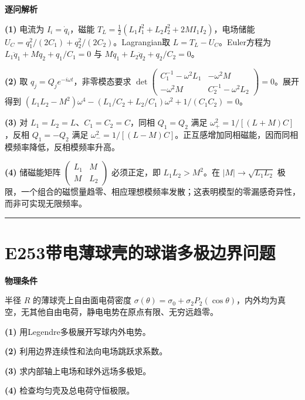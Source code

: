 \documentclass[UTF8,a4paper,11pt,oneside,openany]{ctexbook}
\begin{document}
\par\medskip\noindent\textbf{逐问解析}
\par\noindent\textbf{(1)} 电流为 \(I_i=\dot q_i\)，磁能 \(T_L=\tfrac12(L_1I_1^2+L_2I_2^2+2MI_1I_2)\)，电场储能 \(U_C=q_1^2/(2C_1)+q_2^2/(2C_2)\)。Lagrangian取 \(L=T_L-U_C\)。Euler方程为 \(L_1\ddot q_1+M\ddot q_2+q_1/C_1=0\) 与 \(M\ddot q_1+L_2\ddot q_2+q_2/C_2=0\)。
\par\noindent\textbf{(2)} 取 \(q_j=Q_je^{-i\omega t}\)，非零模态要求 \(\det\begin{pmatrix}C_1^{-1}-\omega^2L_1&-\omega^2M\\-\omega^2M&C_2^{-1}-\omega^2L_2\end{pmatrix}=0\)。展开得到 \((L_1L_2-M^2)\omega^4-(L_1/C_2+L_2/C_1)\omega^2+1/(C_1C_2)=0\)。
\par\noindent\textbf{(3)} 对 \(L_1=L_2=L\)、\(C_1=C_2=C\)，同相 \(Q_1=Q_2\) 满足 \(\omega_+^2=1/[(L+M)C]\)，反相 \(Q_1=-Q_2\) 满足 \(\omega_-^2=1/[(L-M)C]\)。正互感增加同相磁能，因而同相模频率降低，反相模频率升高。
\par\noindent\textbf{(4)} 储磁能矩阵 \(\begin{pmatrix}L_1&M\\M&L_2\end{pmatrix}\) 必须正定，即 \(L_1L_2>M^2\)。在 \(|M|\to\sqrt{L_1L_2}\) 极限，一个组合的磁惯量趋零、相应理想模频率发散；这表明模型的零漏感奇异性，而非可实现无限频率。

\par\bigskip\hrule\bigskip
\section*{E253\quad 带电薄球壳的球谐多极边界问题}
\textbf{物理条件}\par 半径 \(R\) 的薄球壳上自由面电荷密度 \(\sigma(\theta)=\sigma_0+\sigma_2P_2(\cos\theta)\)，内外均为真空，无其他自由电荷，静电电势在原点有限、无穷远趋零。
\par\noindent\textbf{(1)} 用Legendre多极展开写球内外电势。
\par\noindent\textbf{(2)} 利用边界连续性和法向电场跳跃求系数。
\par\noindent\textbf{(3)} 求内部轴上电场和球外远场多极矩。
\par\noindent\textbf{(4)} 检查均匀壳及总电荷守恒极限。
\end{document}
